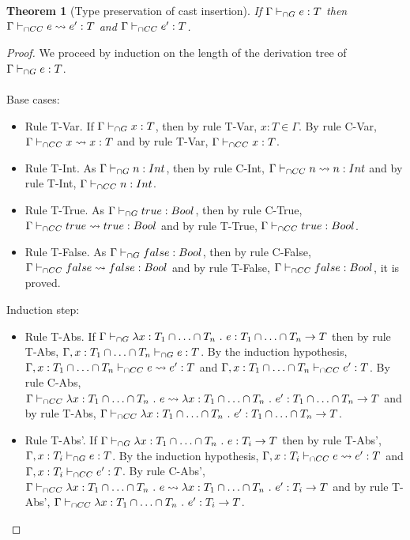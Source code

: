 \documentclass[a4paper]{article}
\newtheorem{theorem}{Theorem}[section]
\begin{document}
\begin{theorem}[Type preservation of cast insertion]
\label{type_preservation_cast_insertion}
If $\Gamma \vdash_{\cap G} e : T$ then $\Gamma \vdash_{\cap CC} e \leadsto e' : T$ and $\Gamma \vdash_{\cap CC} e' : T$.
\end{theorem}
\begin{proof}
We proceed by induction on the length of the derivation tree of $\Gamma \vdash_{\cap G} e : T$.\\\\
Base cases:
\begin{itemize}
    \item Rule T-Var.
    If $\Gamma \vdash_{\cap G} x : T$, then by rule T-Var, $x : T \in \Gamma$.
    By rule C-Var, $\Gamma \vdash_{\cap CC} x \leadsto x : T$ and by rule T-Var, $\Gamma \vdash_{\cap CC} x : T$.
    \item Rule T-Int.
    As $\Gamma \vdash_{\cap G} n : {Int}$, then by rule C-Int, $\Gamma \vdash_{\cap CC} n \leadsto n : {Int}$ and by rule T-Int, $\Gamma \vdash_{\cap CC} n : {Int}$.
    \item Rule T-True.
    As $\Gamma \vdash_{\cap G} true : Bool$, then by rule C-True, $\Gamma \vdash_{\cap CC} true \leadsto true : Bool$ and by rule T-True, $\Gamma \vdash_{\cap CC} true : Bool$.
    \item Rule T-False.
    As $\Gamma \vdash_{\cap G} false : Bool$, then by rule C-False, $\Gamma \vdash_{\cap CC} false \leadsto false : Bool$ and by rule T-False, $\Gamma \vdash_{\cap CC} false : Bool$, it is proved.
\end{itemize}
Induction step:
\begin{itemize}
    \item Rule T-Abs.
    If $\Gamma \vdash_{\cap G} \lambda x : T_1 \cap \ldots \cap T_n\ .\ e : T_1 \cap \ldots \cap T_n \rightarrow T$ then by rule T-Abs, $\Gamma, x : T_1 \cap \ldots \cap T_n \vdash_{\cap G} e : T$.
    By the induction hypothesis, $\Gamma, x : T_1 \cap \ldots \cap T_n \vdash_{\cap CC} e \leadsto e' : T$ and $\Gamma, x : T_1 \cap \ldots \cap T_n \vdash_{\cap CC} e' : T$.
    By rule C-Abs, $\Gamma \iccts \lambda x : T_1 \cap \ldots \cap T_n\ .\ e \leadsto \lambda x : T_1 \cap \ldots \cap T_n\ .\ e' : T_1 \cap \ldots \cap T_n \rightarrow T$ and by rule T-Abs, $\Gamma \iccts \lambda x : T_1 \cap \ldots \cap T_n\ .\ e' : T_1 \cap \ldots \cap T_n \rightarrow T$.
    \item Rule T-Abs'.
    If $\Gamma \vdash_{\cap G} \lambda x : T_1 \cap \ldots \cap T_n\ .\ e : T_i \rightarrow T$ then by rule T-Abs', $\Gamma, x : T_i \vdash_{\cap G} e : T$.
    By the induction hypothesis, $\Gamma, x : T_i \vdash_{\cap CC} e \leadsto e' : T$ and $\Gamma, x : T_i \vdash_{\cap CC} e' : T$.
    By rule C-Abs', $\Gamma \vdash_{\cap CC} \lambda x : T_1 \cap \ldots \cap T_n\ .\ e \leadsto \lambda x : T_1 \cap \ldots \cap T_n\ .\ e' : T_i \rightarrow T$ and by rule T-Abs', $\Gamma \iccts \lambda x : T_1 \cap \ldots \cap T_n\ .\ e' : T_i \rightarrow T$.

\end{itemize}
\end{proof}
\end{document}
